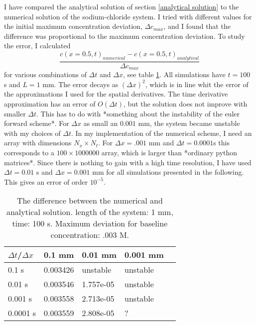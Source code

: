 \documentclass{article}
\begin{document}
I have compared the analytical solution of section \ref{analytical solution} to the numerical solution of the sodium-chloride system. I tried with different values for the initial maximum concentration deviation, $\Delta c_{max}$, and I found that the difference was proportional to the maximum concentration deviation. To study the error, I calculated
\begin{equation}
\frac{c(x=0.5,t)_{numerical}-c(x=0.5,t)_{analytical}}{\Delta c_{max}}
\end{equation}
for various combinations of $\Delta t$ and $\Delta x$, see table \ref{tab:error}. All simulations have $t = 100$ s and $L=1$ mm. The error decays as $(\Delta x)^2$, which is in line whit the error of the  approximations I used for the spatial derivatives. The time derivative approximation has an error of $O(\Delta t)$, but the solution does not improve with smaller $\Delta t$. This has to do with *something about the instability of the euler forward scheme*.
For $\Delta x$ as small an $0.001$ mm, the system became unstable with my choices of $\Delta t$. In my implementation of the numerical scheme, I need an array with dimensions $N_x \times N_t$. For $\Delta x = .001$ mm and $\Delta t = 0.0001$s this corresponds to a $100\times 1000 000$ array, which is larger than *ordinary python matrices*. 
Since there is nothing to gain with a high time resolution, I have used $\Delta t = 0.01$ s and $\Delta x = 0.001$ mm for all simulations presented in the following. This gives an error of order $10^{-5}$. 
\begin{table}[h!]
  \centering
  \caption{The difference between the numerical and analytical solution. length of the system: 1 mm, time: 100 s. Maximum deviation for baseline concentration: .003 M.  }
  \label{tab:error}
  \begin{tabular}{l||l|l|l|l}
$\Delta t$/$\Delta x$ & 0.1 mm & 0.01 mm & 0.001 mm  \\
\hline
0.1 s & 0.003426 &  unstable & unstable \\
0.01 s & 0.003546 & 1.757e-05  & unstable \\
0.001 s & 0.003558 & 2.713e-05 & unstable \\
0.0001 s & 0.003559& 2.808e-05 & ? \\

 \end{tabular}
\end{table}
\end{document}
